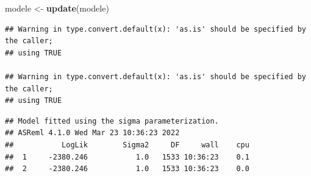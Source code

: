 \documentclass[
  12pt,
]{book}
\newenvironment{Shaded}{\begin{snugshade}}{\end{snugshade}}
\newcommand{\KeywordTok}[1]{\textcolor[rgb]{0.13,0.29,0.53}{\textbf{#1}}}
\newcommand{\NormalTok}[1]{#1}
\newcommand{\OperatorTok}[1]{\textcolor[rgb]{0.81,0.36,0.00}{\textbf{#1}}}
\newcommand{\StringTok}[1]{\textcolor[rgb]{0.31,0.60,0.02}{#1}}
\begin{document}
\begin{Shaded}
\begin{Highlighting}[]
\NormalTok{modele \textless{}{-}}\StringTok{ }\KeywordTok{update}\NormalTok{(modele)}
\end{Highlighting}
\end{Shaded}

\begin{verbatim}
## Warning in type.convert.default(x): 'as.is' should be specified by the caller;
## using TRUE

## Warning in type.convert.default(x): 'as.is' should be specified by the caller;
## using TRUE
\end{verbatim}

\begin{verbatim}
## Model fitted using the sigma parameterization.
## ASReml 4.1.0 Wed Mar 23 10:36:23 2022
##           LogLik        Sigma2     DF     wall    cpu
##  1     -2380.246           1.0   1533 10:36:23    0.1
##  2     -2380.246           1.0   1533 10:36:23    0.0
\end{verbatim}

\begin{Shaded}
\end{Shaded}
\end{document}

